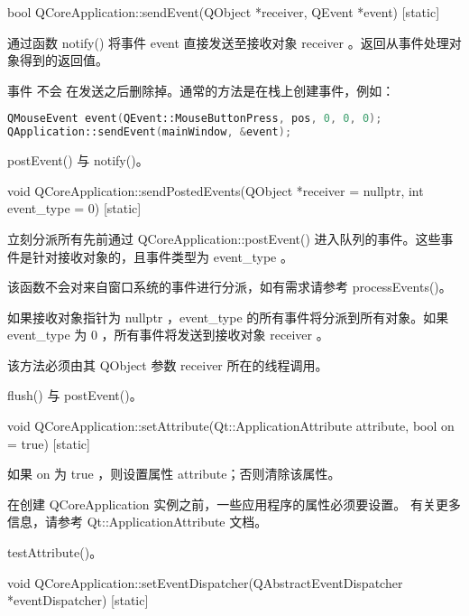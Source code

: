 bool QCoreApplication::sendEvent(QObject *receiver, QEvent *event) [static]

通过函数 notify() 将事件 event 直接发送至接收对象 receiver 。返回从事件处理对象得到的返回值。

事件 不会 在发送之后删除掉。通常的方法是在栈上创建事件，例如：

\begin{lstlisting}[language=C++]
QMouseEvent event(QEvent::MouseButtonPress, pos, 0, 0, 0);
QApplication::sendEvent(mainWindow, &event);
\end{lstlisting}



\begin{seeAlso}
postEvent() 与 notify()。
\end{seeAlso}

void QCoreApplication::sendPostedEvents(QObject *receiver = nullptr, int event\_type = 0) [static]

立刻分派所有先前通过 QCoreApplication::postEvent() 进入队列的事件。这些事件是针对接收对象的，且事件类型为 event\_type 。

该函数不会对来自窗口系统的事件进行分派，如有需求请参考 processEvents()。

如果接收对象指针为 nullptr ，event\_type 的所有事件将分派到所有对象。如果 event\_type 为 0 ，所有事件将发送到接收对象 receiver 。


\begin{notice}
该方法必须由其 QObject 参数 receiver 所在的线程调用。

\end{notice}


\begin{seeAlso}
flush() 与 postEvent()。
\end{seeAlso}

void QCoreApplication::setAttribute(Qt::ApplicationAttribute attribute, bool on = true) [static]

如果 on 为 true ，则设置属性 attribute；否则清除该属性。

\begin{notice}
在创建 QCoreApplication 实例之前，一些应用程序的属性必须要设置。 有关更多信息，请参考 Qt::ApplicationAttribute 文档。
\end{notice}

\begin{seeAlso}
testAttribute()。
\end{seeAlso}

void QCoreApplication::setEventDispatcher(QAbstractEventDispatcher *eventDispatcher) [static]


